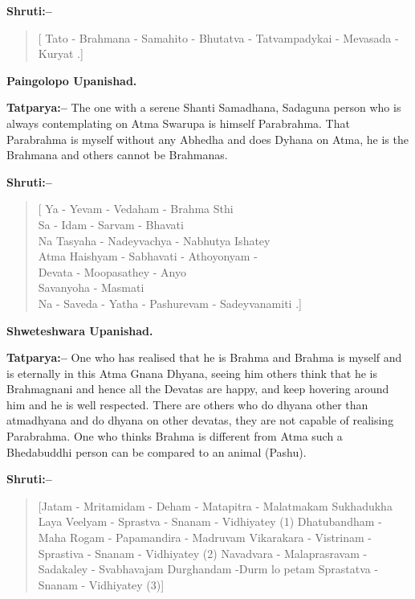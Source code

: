 \textbf{Shruti:–}

\begin{verse}
[ Tato - Brahmana - Samahito - Bhutatva - Tatvampadykai - Mevasada - Kuryat .]
\end{verse}

\begin{flushright}
\textbf{Paingolopo Upanishad.}
\end{flushright}

\textbf{Tatparya:–} The one with a serene Shanti Samadhana, Sadaguna person who is always contemplating on Atma Swarupa is himself Parabrahma. That Parabrahma is myself without any Abhedha and does Dyhana on Atma, he is the Brahmana and others cannot be Brahmanas.

\textbf{Shruti:–}

\begin{verse}
[ Ya - Yevam - Vedaham - Brahma Sthi \\ Sa - Idam - Sarvam - Bhavati \\ Na Tasyaha - Nadeyvachya - Nabhutya Ishatey \\ Atma Haishyam - Sabhavati - Athoyonyam -\\ Devata - Moopasathey - Anyo \\ Savanyoha - Masmati \\ Na - Saveda - Yatha - Pashurevam - Sadeyvanamiti .]
\end{verse}

\begin{flushright}
\textbf{Shweteshwara Upanishad.}
\end{flushright}

\textbf{Tatparya:–} One who has realised that he is Brahma and Brahma is myself and is eternally in this Atma Gnana Dhyana, seeing him others think that he is Brahmagnani and hence all the Devatas are happy, and keep hovering around him and he is well respected. There are others who do dhyana other than atmadhyana and do dhyana on other devatas, they are not capable of realising Parabrahma. One who thinks Brahma is different from Atma such a Bhedabuddhi person can be compared to an animal (Pashu).

\newpage

\textbf{Shruti:–}

\begin{verse}
[Jatam - Mritamidam - Deham - Matapitra - Malatma\break kam  Sukhadukha Laya Veelyam - Sprastva - Snanam - Vidhiyatey  (1) Dhatubandham - Maha Rogam - Papamandira - Madruvam  Vikarakara - Vistrinam - Sprastiva - Snanam - Vidhiyatey  (2) Navadvara - Malaprasravam - Sadakaley - Svabhavajam  Durghandam -\break Durm lo petam Sprastatva - Snanam - Vidhiyatey (3)]
\end{verse}

